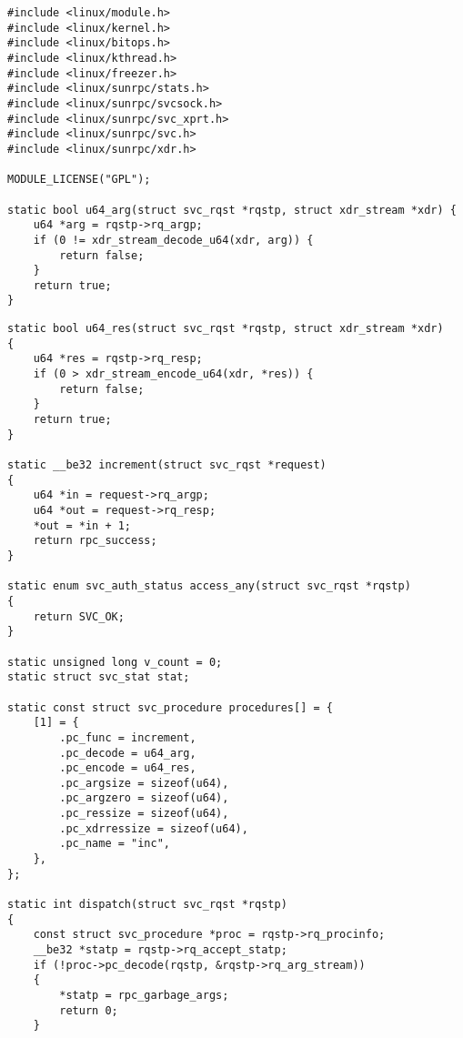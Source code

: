\begin{lstlisting}[caption={Прототип сервера (часть 1)}, label={lst:server_prototype1}]
#include <linux/module.h>
#include <linux/kernel.h>
#include <linux/bitops.h>
#include <linux/kthread.h>
#include <linux/freezer.h>
#include <linux/sunrpc/stats.h>
#include <linux/sunrpc/svcsock.h>
#include <linux/sunrpc/svc_xprt.h>
#include <linux/sunrpc/svc.h>
#include <linux/sunrpc/xdr.h>

MODULE_LICENSE("GPL");

static bool u64_arg(struct svc_rqst *rqstp, struct xdr_stream *xdr) {
    u64 *arg = rqstp->rq_argp;
    if (0 != xdr_stream_decode_u64(xdr, arg)) {
        return false;
    }
    return true;
}
\end{lstlisting}
\clearpage
\begin{lstlisting}[caption={Прототип сервера (часть 2)}, label={lst:server_prototype2}]
static bool u64_res(struct svc_rqst *rqstp, struct xdr_stream *xdr)
{
    u64 *res = rqstp->rq_resp;
    if (0 > xdr_stream_encode_u64(xdr, *res)) {
        return false;
    }
    return true;
}

static __be32 increment(struct svc_rqst *request)
{
    u64 *in = request->rq_argp;
    u64 *out = request->rq_resp;
    *out = *in + 1;
    return rpc_success;
}

static enum svc_auth_status access_any(struct svc_rqst *rqstp)
{
    return SVC_OK;
}

static unsigned long v_count = 0;
static struct svc_stat stat;

static const struct svc_procedure procedures[] = {
    [1] = {
        .pc_func = increment,
        .pc_decode = u64_arg,
        .pc_encode = u64_res,
        .pc_argsize = sizeof(u64),
        .pc_argzero = sizeof(u64),
        .pc_ressize = sizeof(u64),
        .pc_xdrressize = sizeof(u64),
        .pc_name = "inc",
    },
};

static int dispatch(struct svc_rqst *rqstp)
{
    const struct svc_procedure *proc = rqstp->rq_procinfo;
    __be32 *statp = rqstp->rq_accept_statp;
    if (!proc->pc_decode(rqstp, &rqstp->rq_arg_stream))
    {
        *statp = rpc_garbage_args;
        return 0;
    }
\end{lstlisting}
\clearpage
